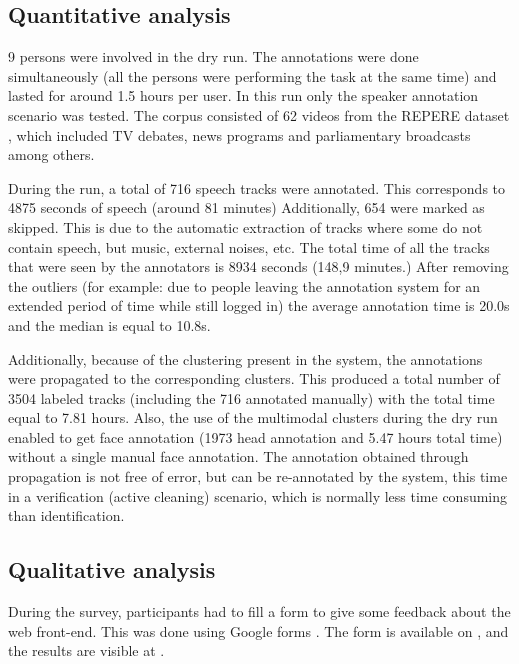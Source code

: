 \documentclass[a4paper]{article}
\begin{document}
      
      \subsection{Quantitative analysis}
 
9 persons were involved in the dry run. The annotations were done simultaneously (all the persons were performing the task at the same time) and lasted for around 1.5 hours per user.
In this run only the speaker annotation scenario was tested. The corpus consisted of 62 videos from the REPERE dataset \cite{giraudel2012repere}, which included TV debates, news programs and parliamentary broadcasts among others.  

During the run, a total of 716 speech tracks were annotated. This corresponds to 4875 seconds of speech (around 81 minutes) Additionally, 654 were marked as skipped. This is due to the automatic extraction of tracks where some do not contain speech, but music, external noises, etc. The total time of all the tracks that were seen by the annotators is 8934 seconds (148,9 minutes.)
After removing the outliers (for example: due to people leaving the annotation system for an extended period of time while still logged in) the average annotation time is 20.0s and the median is equal to 10.8s.

Additionally, because of the clustering present in the system, the annotations were propagated to the corresponding clusters. This produced a total number of 3504 labeled tracks (including the 716 annotated manually) with the total time equal to 7.81 hours. Also, the use of the multimodal clusters during the dry run enabled to get face annotation (1973 head annotation and 5.47 hours total time)
without a single manual face annotation. The annotation obtained through propagation is not free of error, but can be re-annotated by the system, this time in a verification (active cleaning) scenario, which is normally less time consuming than identification.


 
    

  
     \subsection{Qualitative analysis}
    

During the survey, participants had to fill a form to give some  feedback about the web front-end. This was done using Google forms \cite{url-google-forms}. The form is available on \cite{url-list-form}, and the results are visible at \cite{url-list-form-results}.
\end{document}
